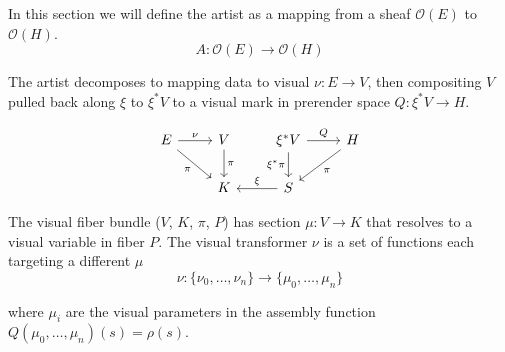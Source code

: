 \documentclass[../main.tex]{subfiles}
\begin{document}
In this section we will define the artist as a mapping from a sheaf $\mathcal{O}(E)$  to $\mathcal{O}(H)$. 
\begin{equation}
    A: \mathcal{O}(E) \rightarrow \mathcal{O}(H)
\end{equation}

The artist decomposes to mapping data to visual $\nu:E\rightarrow V$, then  compositing $V$ pulled back along $\xi$ to $\xi^*V$ to a visual mark in prerender space $Q:\xi^*V\rightarrow H$. 

\begin{equation}
    \label{eq:artist}
\begin{tikzcd}
    E \arrow[r, "\nu"] \arrow[rd, "\pi"'] & V \arrow[d, "\pi"] & \xi^*V \arrow[r, "Q"] \arrow[d, "\xi^*\pi"'] & H \arrow[ld, "\pi"] \\
                                          & K                  & S \arrow[l, "\xi"']                          &                    
\end{tikzcd}
\end{equation}

The visual fiber bundle ($V$, $K$, $\pi$, $P$) has section $\mu: V \rightarrow K$ that resolves to a visual variable \cite{bertinIIPropertiesGraphic2011,munznerMarksChannels} in fiber $P$. The visual transformer $\nu$ is a set of functions each targeting a different $\mu$
\begin{equation}
    \label{eq:nu_expanded}
    \nu:\{\nu_{0}, \ldots, \nu_{n}\} \rightarrow \{\mu_{0}, \ldots, \mu_{n}\}
\end{equation}

where $\mu_{i}$ are the visual parameters in the assembly function $Q(\mu_{0}, \ldots, \mu_{n})(s) = \rho(s)$. 
\end{document}
